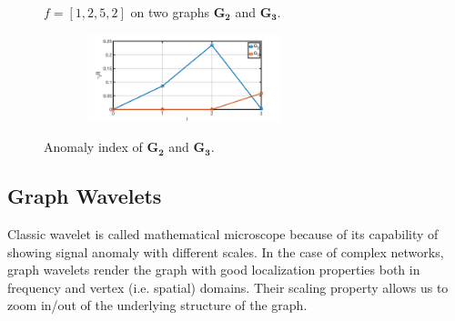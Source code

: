 \documentclass[conference]{IEEEtran}
\begin{document}
\begin{figure}[t]
	\centering
	\caption{$f=[1,2,5,2]$ on two graphs $\mathbf{G_2}$ and $\mathbf{G_3}$.}
	\label{fig:f_on_g}
\end{figure}

\begin{figure}[h]
	\centering
    {
		\includegraphics[width= 3.2in,height=1in] {figures/new_graph.png}
		\label{fig:distribution2}
	}
	\caption{Anomaly index of $\mathbf{G_2}$ and $\mathbf{G_3}$.}
	\label{fig:new_graph}
\end{figure}


\subsection{Graph Wavelets}
\label{sec:graph_wavelet}
Classic wavelet is called mathematical microscope because of its capability of showing signal anomaly with different scales.
In the case of complex networks, graph wavelets render the graph with good localization properties both in frequency and vertex (i.e. spatial) domains. Their scaling property allows us to zoom in/out of the underlying structure of the graph.
\end{document}
